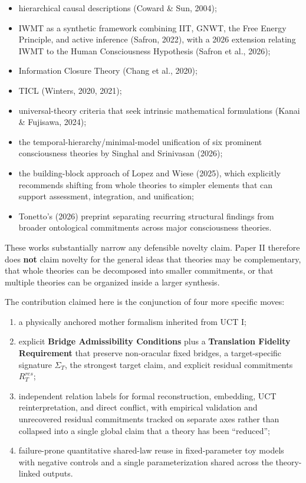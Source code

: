 \documentclass[
  11pt,
  a4paper,
]{article}
\providecommand{\tightlist}{%
  \setlength{\itemsep}{0pt}\setlength{\parskip}{0pt}}
\begin{document}
\begin{itemize}
\tightlist
\item
  hierarchical causal descriptions (Coward \& Sun, 2004);
\item
  IWMT as a synthetic framework combining IIT, GNWT, the Free Energy
  Principle, and active inference (Safron, 2022), with a 2026 extension
  relating IWMT to the Human Consciousness Hypothesis (Safron et al.,
  2026);
\item
  Information Closure Theory (Chang et al., 2020);
\item
  TICL (Winters, 2020, 2021);
\item
  universal-theory criteria that seek intrinsic mathematical
  formulations (Kanai \& Fujisawa, 2024);
\item
  the temporal-hierarchy/minimal-model unification of six prominent
  consciousness theories by Singhal and Srinivasan (2026);
\item
  the building-block approach of Lopez and Wiese (2025), which
  explicitly recommends shifting from whole theories to simpler elements
  that can support assessment, integration, and unification;
\item
  Tonetto's (2026) preprint separating recurring structural findings
  from broader ontological commitments across major consciousness
  theories.
\end{itemize}

These works substantially narrow any defensible novelty claim. Paper II
therefore does \textbf{not} claim novelty for the general ideas that
theories may be complementary, that whole theories can be decomposed
into smaller commitments, or that multiple theories can be organized
inside a larger synthesis.

The contribution claimed here is the conjunction of four more specific
moves:

\begin{enumerate}
\def\labelenumi{\arabic{enumi}.}
\tightlist
\item
  a physically anchored mother formalism inherited from UCT I;
\item
  explicit \textbf{Bridge Admissibility Conditions} plus a
  \textbf{Translation Fidelity Requirement} that preserve non-oracular
  fixed bridges, a target-specific signature \(\Sigma_T\), the strongest
  target claim, and explicit residual commitments \(R_T^{res}\);
\item
  independent relation labels for formal reconstruction, embedding, UCT
  reinterpretation, and direct conflict, with empirical validation and
  unrecovered residual commitments tracked on separate axes rather than
  collapsed into a single global claim that a theory has been
  ``reduced'';
\item
  failure-prone quantitative shared-law reuse in fixed-parameter toy
  models with negative controls and a single parameterization shared
  across the theory-linked outputs.
\end{enumerate}
\end{document}
